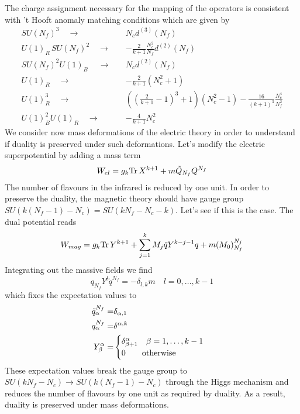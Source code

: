 The charge assignment necessary for the mapping of the operators is consistent with 't Hooft anomaly matching conditions which are given by
\begin{equation}
\begin{aligned}
SU(N_f)^3 \quad \longrightarrow \quad   & N_c d^{(3)}(N_f) \\
U(1)_R\, SU(N_f)^2 \quad \longrightarrow \quad  & -\frac{2}{k+1} \frac{N_c^2}{N_f} d^{(2)} (N_f) \\
SU(N_f)^2 U(1)_B\ \quad \longrightarrow \quad  & N_c d^{(2)}(N_f) \\
U(1)_R \quad \longrightarrow \quad  & - \frac{2}{k+1} (N_c^2 + 1) \\
U(1)_R^3 \quad \longrightarrow \quad  & \left( \left(\frac{2}{k+1} -1 \right)^3 +1 \right) (N_c^2-1) - \frac{16}{(k+1)^3} \frac{N_c^4}{N_f^2} \\
U(1)_B^2 U(1)_R \quad \longrightarrow \quad  & - \frac{4}{k+1} N_c^2
\end{aligned}
\end{equation}
We consider now mass deformations of the electric theory in order to understand if duality is preserved under such deformations.
Let's modify the electric superpotential by adding a mass term
\begin{equation}
W_{el} =  g_k \mathrm{Tr } \, X^{k+1} + m \tilde{Q}_{N_f} Q^{N_f}
\end{equation}
The number of flavours in the infrared is reduced by one unit. 
In order to preserve the duality, the magnetic theory should have gauge group $SU( k (N_f - 1) - N_c) = SU(k N_f - N_c - k)$.
Let's see if this is the case.
The dual potential reads
\begin{equation}
W_{mag} = g_k \mathrm{Tr } \, Y^{k+1} + \sum_{j=1}^k M_j \tilde{q} Y^{k-j-1} q + m (M_0)^{N_f}_{N_f}
\end{equation}
Integrating out the massive fields we find 
\begin{equation}
 q_{N_f} Y^{l} \tilde{q}^{N_f} = - \delta_{l,k} m \quad l=0,\dotsc, k-1
\end{equation}
which fixes the expectation values to
\begin{equation}
\begin{aligned}
\tilde{q}_{\alpha}^{N_f} = & \delta_{\alpha,1} \\
q_{\alpha}^{N_f} = & \delta^{\alpha,k}\\
Y^{\alpha}_{\beta} = & 
	\begin{cases}
		\delta_{\beta+1}^{\alpha} \quad \beta = 1 , \dotsc, k-1 \\
		0 \qquad \hbox{otherwise}
	\end{cases}
\end{aligned}
\end{equation}
These expectation values break the gauge group to $SU(k N_f - N_c) \rightarrow SU( k (N_f -1) - N_c) $ through the Higgs mechanism and reduces the number of flavours by one unit as required by duality.
As a result, duality is preserved under mass deformations.
